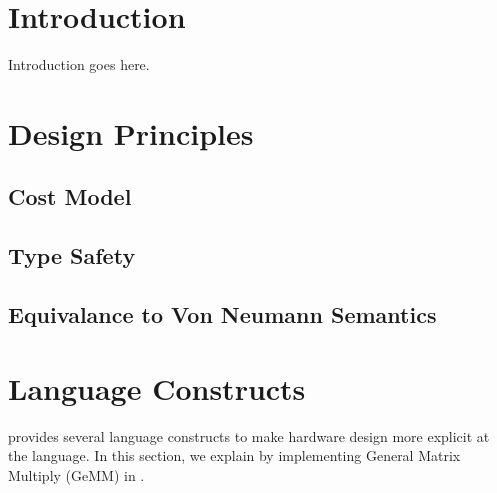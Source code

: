\documentclass[acmsmall,review,anonymous]{acmart}\settopmatter{printfolios=true,printccs=false,printacmref=false}
\begin{document}


\maketitle

\section{Introduction}
Introduction goes here.

\section{Design Principles}
\subsection{Cost Model}
\subsection{Type Safety}
\subsection{Equivalance to Von Neumann Semantics}

\section{Language Constructs}
\sys provides several language constructs to make hardware design more explicit
at the language. In this section, we explain by implementing General Matrix Multiply
(GeMM) in \sys.
\end{document}
